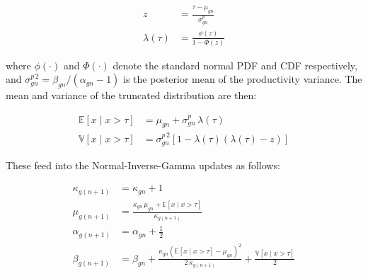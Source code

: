 \documentclass[]{article}
\begin{document}
\begin{align*}
	z &= \frac{\tau - \mu_{gn}}{\sigma^p_{gn}} \\[6pt]
	\lambda(\tau) &= \frac{\phi(z)}{1 - \Phi(z)}
\end{align*}

\noindent where $\phi(\cdot)$ and $\Phi(\cdot)$ denote the standard normal PDF and CDF 
respectively, and $\sigma^{p\,2}_{gn} = \beta_{gn}/(\alpha_{gn}-1)$ is the posterior 
mean of the productivity variance. The mean and variance of the truncated 
distribution are then:

\begin{align*}
	\mathbb{E}\!\left[x \mid x > \tau\right] 
	&= \mu_{gn} + \sigma^p_{gn}\,\lambda(\tau) \\[6pt]
	\mathbb{V}\!\left[x \mid x > \tau\right] 
	&= \sigma^{p\,2}_{gn}\!\left[1 - \lambda(\tau)
	\left(\lambda(\tau) - z\right)\right]
\end{align*}

\noindent These feed into the Normal-Inverse-Gamma updates as follows:

\begin{align*}
	\kappa_{g(n+1)} &= \kappa_{gn} + 1 \\[6pt]
	\mu_{g(n+1)}    &= \frac{\kappa_{gn}\,\mu_{gn} 
		+ \mathbb{E}[x \mid x > \tau]}{\kappa_{g(n+1)}} \\[6pt]
	\alpha_{g(n+1)} &= \alpha_{gn} + \frac{1}{2} \\[6pt]
	\beta_{g(n+1)}  &= \beta_{gn} 
	+ \frac{\kappa_{gn}
		\left(\mathbb{E}[x \mid x > \tau] - \mu_{gn}\right)^2}
	{2\,\kappa_{g(n+1)}}
	+ \frac{\mathbb{V}[x \mid x > \tau]}{2}
\end{align*}

%
\end{document}

